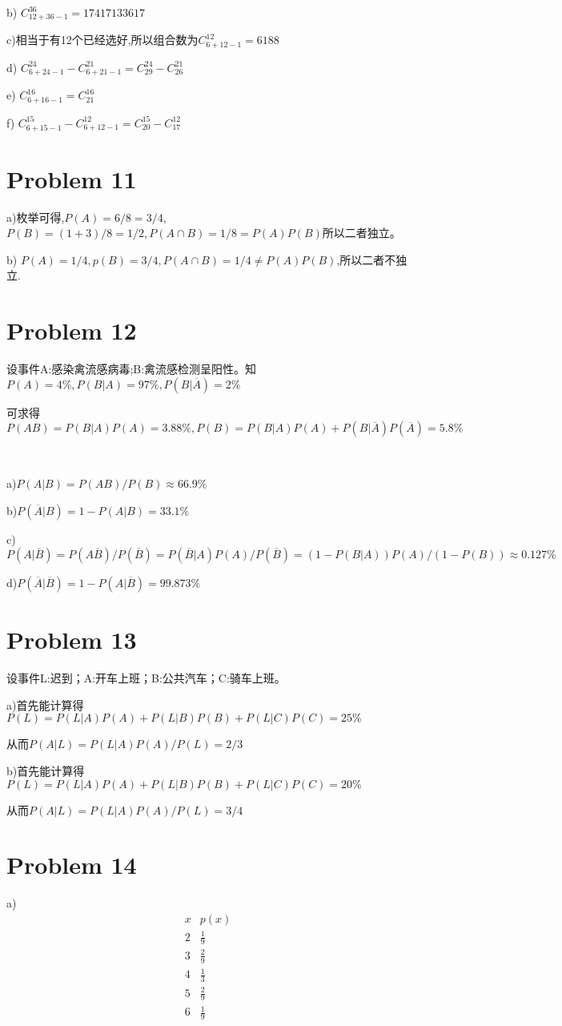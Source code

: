 \documentclass{article}
\begin{document}
b) $C_{12+36-1}^{36}=17417133617$

c)相当于有12个已经选好,所以组合数为$C_{6+12-1}^{12}=6188$

d) $C_{6+24-1}^{24} - C_{6+21-1}^{21}=C_{29}^{24} - C_{26}^{21}$

e) $C_{6+16-1}^{16}=C_{21}^{16}$

f) $C_{6+15-1}^{15}- C_{6+12-1}^{12}=C_{20}^{15}-C_{17}^{12}$

\section*{Problem 11}
a)枚举可得,$P(A) = 6/8=3/4$,$P(B)= (1+3)/8=1/2,P(A\cap B)=1/8 = P(A)P(B)$所以二者独立。

b) $P(A)=1/4,p(B)=3/4,P(A\cap B)=1/4 \neq P(A)P(B)$,所以二者不独立.

\section*{Problem 12}
设事件A:感染禽流感病毒;B:禽流感检测呈阳性。知$P(A)=4\%,P(B|A)=97\%,P(B|\overline{A})=2\%$

可求得$P(AB) = P(B|A)P(A)=3.88\%,P(B)=P(B|A)P(A)+P(B|\overline{A})P(\overline{A}) = 5.8\%$

~\

a)$P(A|B) = P(AB)/P(B) \approx 66.9\%$

b)$P(\overline{A}|B) = 1-P(A|B) = 33.1\%$

c)$P(A|\overline{B})=P(A\overline{B})/P(\overline{B})=P(\overline{B}|A)P(A)/P(\overline{B})=(1-P(B|A))P(A)/(1-P(B)) \approx 0.127\% $

d)$P(\overline{A}|\overline{B}) = 1-P(A|\overline{B})=99.873\%$

\section*{Problem 13}
设事件L:迟到；A:开车上班；B:公共汽车；C:骑车上班。


a)首先能计算得$P(L)=P(L|A)P(A)+P(L|B)P(B)+P(L|C)P(C)=25\%$

从而$P(A|L)=P(L|A)P(A)/P(L)=2/3$

b)首先能计算得$P(L)=P(L|A)P(A)+P(L|B)P(B)+P(L|C)P(C)=20\%$

从而$P(A|L)=P(L|A)P(A)/P(L)=3/4$

\section*{Problem 14}
a)
\begin{equation}
    \nonumber
    \begin{array}{c|c}
        \hline x & p(x) \\
        \hline 2 & \frac{1}{9} \\
        \hline 3 & \frac{2}{9} \\
        \hline 4 & \frac{1}{3} \\
        \hline 5 & \frac{2}{9} \\
        \hline 6 & \frac{1}{9} \\
    \end{array}
\end{equation}
\end{document}
